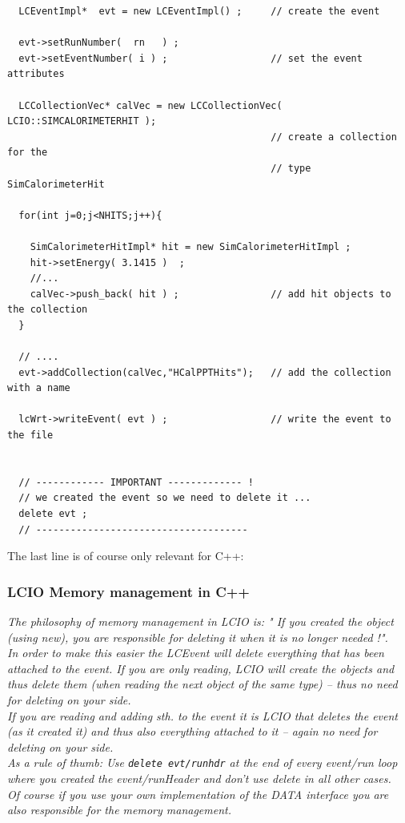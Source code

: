 \documentclass[twoside]{article}
\begin{document}
\begin{verbatim}
  LCEventImpl*  evt = new LCEventImpl() ;     // create the event 

  evt->setRunNumber(  rn   ) ;
  evt->setEventNumber( i ) ;                  // set the event attributes

  LCCollectionVec* calVec = new LCCollectionVec( LCIO::SIMCALORIMETERHIT );   
                                              // create a collection for the 
                                              // type SimCalorimeterHit

  for(int j=0;j<NHITS;j++){
  
    SimCalorimeterHitImpl* hit = new SimCalorimeterHitImpl ;
    hit->setEnergy( 3.1415 )  ;
    //...  
    calVec->push_back( hit ) ;                // add hit objects to the collection
  }

  // ....
  evt->addCollection(calVec,"HCalPPTHits");   // add the collection with a name

  lcWrt->writeEvent( evt ) ;                  // write the event to the file


  // ------------ IMPORTANT ------------- ! 
  // we created the event so we need to delete it ...
  delete evt ;
  // -------------------------------------
\end{verbatim}

The last line is of course only relevant for C++:

\subsubsection{ LCIO Memory management in C++}
{\em The philosophy of memory management in LCIO is: " If you created the object (using new),
you are responsible for deleting it when it is no longer needed !".\\
In order to make this easier the LCEvent will delete everything that has been attached to the event.
If you are only reading, LCIO will create the objects and thus delete them (when reading the next 
object of the same type) -- thus no need for deleting on your side.\\
If you are reading and adding sth. to the event it is  LCIO that deletes the event 
(as it created it) and thus also everything attached to it -- again no need for deleting on your 
side.\\
As a rule of thumb: Use \verb$delete evt/runhdr$ at the end of every event/run loop where you 
created the event/runHeader and don't use delete in all other cases.\\
Of course if you use your own implementation of the DATA interface you are also responsible for the 
memory management.}
 
\end{document}
